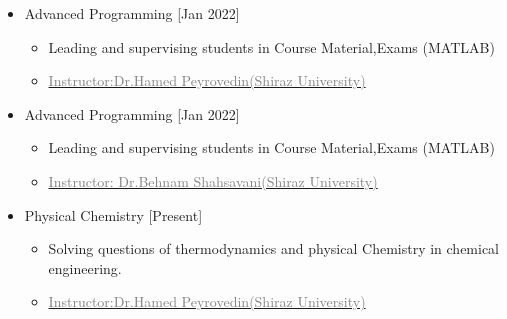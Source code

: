 \documentclass[10pt,a4paper,sans]{moderncv} %
\begin{document}
\begin{itemize}
\begin{itemize}
	\end{itemize}
	
	\vspace{0.5em}
	
		\begin{itemize}
			\item {} Advanced Programming  \hfill[Jan 2022]
			\begin{itemize} 
				\item Leading and supervising students in Course Material,Exams (MATLAB)
				\item\href{https://scholar.google.com/citations?hl=en&user=KG__hzQAAAAJ}{\textcolor{gray}{Instructor:Dr.Hamed Peyrovedin(Shiraz University)}}
				
			\end{itemize}
	 		
				\newline
			
	\end{itemize}
	
	\vspace{0.5em}
	
	\begin{itemize}
     
			\item {} Advanced Programming  \hfill[Jan 2022]
			\begin{itemize} 
				\item Leading and supervising students in Course Material,Exams (MATLAB)
				\item\href{https://scholar.google.com/citations?user=-ppHUiQAAAAJ&hl=en}{\textcolor{gray}{Instructor: Dr.Behnam Shahsavani(Shiraz University)}}
				
	 		
				\newline
			
		\end{itemize}
		
			\vspace{0.5em} 
			
			\item {} Physical Chemistry  \hfill[Present]
			\begin{itemize} 
				\item Solving questions of thermodynamics and physical Chemistry in chemical engineering.
				\item\href{https://scholar.google.com/citations?hl=en&user=KG__hzQAAAAJ}{\textcolor{gray}{Instructor:Dr.Hamed Peyrovedin(Shiraz University)}}
				

\end{itemize}
\end{itemize}
\end{itemize}
\end{document}
